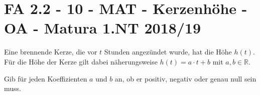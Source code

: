 \section{FA 2.2 - 10 - MAT - Kerzenhöhe - OA - Matura 1.NT 2018/19}

\begin{beispiel}[FA 2.2]{1}
Eine brennende Kerze, die vor $t$ Stunden angezündet wurde, hat die Höhe $h(t)$. Für die Höhe der Kerze gilt dabei näherungsweise $h(t)=a\cdot t+b$ mit $a,b\in\mathbb{R}$.

Gib für jeden Koeffizienten $a$ und $b$ an, ob er positiv, negativ oder genau null sein muss.

\end{beispiel}